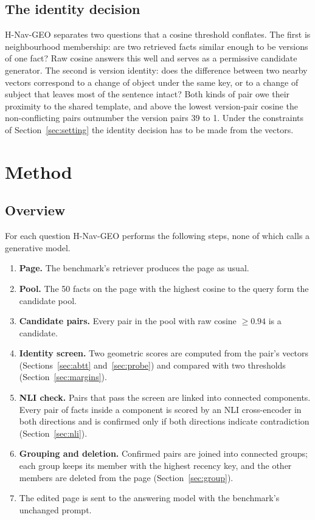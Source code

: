 \documentclass[11pt]{article}
\newcommand{\geo}{H-Nav-GEO}
\begin{document}
\subsection{The identity decision}
\label{sec:identity}

\geo{} separates two questions that a cosine threshold conflates. The first is neighbourhood membership: are two retrieved facts similar enough to be versions of one fact? Raw cosine answers this well and serves as a permissive candidate generator. The second is version identity: does the difference between two nearby vectors correspond to a change of object under the same key, or to a change of subject that leaves most of the sentence intact? Both kinds of pair owe their proximity to the shared template, and above the lowest version-pair cosine the non-conflicting pairs outnumber the version pairs 39 to 1. Under the constraints of Section~\ref{sec:setting} the identity decision has to be made from the vectors.

\section{Method}
\label{sec:method}

\subsection{Overview}
\label{sec:overview}

For each question \geo{} performs the following steps, none of which calls a generative model.
\begin{enumerate}
\item \textbf{Page.} The benchmark's retriever produces the page as usual.
\item \textbf{Pool.} The 50 facts on the page with the highest cosine to the query form the candidate pool.
\item \textbf{Candidate pairs.} Every pair in the pool with raw cosine $\ge0.94$ is a candidate.
\item \textbf{Identity screen.} Two geometric scores are computed from the pair's vectors (Sections~\ref{sec:abtt} and~\ref{sec:probe}) and compared with two thresholds (Section~\ref{sec:margins}).
\item \textbf{NLI check.} Pairs that pass the screen are linked into connected components. Every pair of facts inside a component is scored by an NLI cross-encoder in both directions and is confirmed only if both directions indicate contradiction (Section~\ref{sec:nli}).
\item \textbf{Grouping and deletion.} Confirmed pairs are joined into connected groups; each group keeps its member with the highest recency key, and the other members are deleted from the page (Section~\ref{sec:group}).
\item The edited page is sent to the answering model with the benchmark's unchanged prompt.
\end{enumerate}
\end{document}
